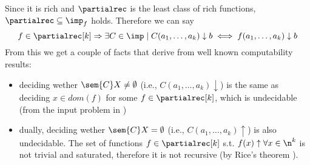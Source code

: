 Since it is rich and \(\partialrec\) is the least class of rich
functions, \(\partialrec \subseteq \imp_f\) holds. Therefore we can
say \[f \in \partialrec[k] \Rightarrow \exists C \in \imp \mid C(a_1,
\dots, a_k)\downarrow b \iff f(a_1, \dots, a_k) \downarrow b\] From
this we get a couple of facts that derive from well known
computability results:
\begin{itemize}
\item deciding wether \(\sem{C}X \neq \emptyset\) (i.e., \(C(a_1,
  \dots, a_k) \downarrow\)) is the same as deciding \(x \in dom(f)\)
  for some \(f \in \partialrec[k]\), which is undecidable (from the
  input problem in \cite[p.~104]{cutland1980computability})
\item dually, deciding wether \(\sem{C}X = \emptyset\) (i.e., \(C(a_1,
  \dots, a_k)\uparrow\)) is also undecidable. The set of functions
  \(f\in \partialrec[k]\) s.t. \(f(x) \uparrow \forall x \in \n^k\) is
  not trivial and saturated, therefore it is not recursive (by Rice's
  theorem \cite{rice1953classes}).
\end{itemize}
